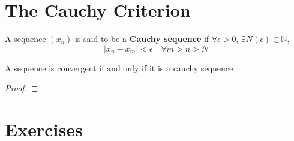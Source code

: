 \section{The Cauchy Criterion}
\begin{definition}
    A sequence $(x_n)$ is said to be a \textbf{Cauchy sequence} if $\forall \epsilon >0$, $\exists N(\epsilon) \in \mathbb{N}$,
    \[ |x_n -x_m| < \epsilon \quad \forall m > n > N\]
\end{definition}
\begin{theorem} A sequence is convergent if and only if it is a cauchy sequence
    \begin{proof}
    \end{proof}
\end{theorem}
\section{Exercises}
